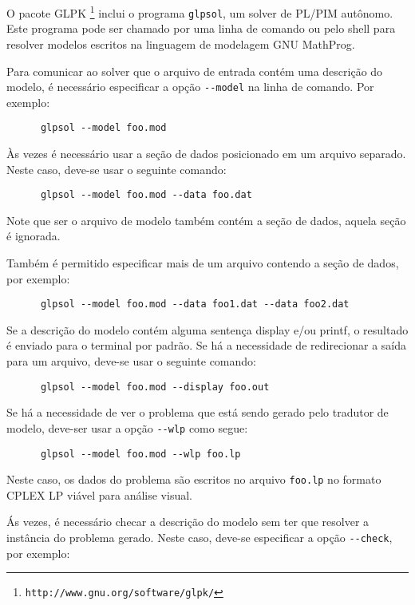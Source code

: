 \documentclass[11pt, brazil]{report}
\begin{document}
O pacote GLPK \footnote{{\tt http://www.gnu.org/software/glpk/}}
inclui o programa {\tt glpsol}, um solver de PL/PIM autônomo. Este
programa pode ser chamado por uma linha de comando ou pelo shell para
resolver modelos escritos na \linebreak linguagem de modelagem GNU MathProg.

Para comunicar ao solver que o arquivo de entrada contém uma descrição
do modelo, é necessário especificar a opção \verb|--model| na linha de
comando. Por exemplo:

\begin{verbatim}
      glpsol --model foo.mod
\end{verbatim}

Às vezes é necessário usar a seção de dados posicionado em um arquivo
separado. Neste caso, deve-se usar o seguinte comando:

\begin{verbatim}
      glpsol --model foo.mod --data foo.dat
\end{verbatim}

\noindent Note que ser o arquivo de modelo também contém a seção de dados,
aquela seção é ignorada.

Também é permitido especificar mais de um arquivo contendo a seção de dados,
por exemplo:

\begin{verbatim}
      glpsol --model foo.mod --data foo1.dat --data foo2.dat
\end{verbatim}

Se a descrição do modelo contém alguma sentença display e/ou printf,
o resultado é enviado para o terminal por padrão. Se há a necessidade
de redirecionar a saída para um arquivo, deve-se usar o seguinte comando:

\begin{verbatim}
      glpsol --model foo.mod --display foo.out
\end{verbatim}

Se há a necessidade de ver o problema que está sendo gerado pelo tradutor
de modelo, deve-ser usar a opção \verb|--wlp| como segue:

\begin{verbatim}
      glpsol --model foo.mod --wlp foo.lp
\end{verbatim}

\noindent Neste caso, os dados do problema são escritos no arquivo
\verb|foo.lp| no formato CPLEX LP viável para análise visual.

Ás vezes, é necessário checar a descrição do modelo sem ter que resolver
a instância do problema gerado. Neste caso, deve-se especificar a opção
\verb|--check|, por exemplo:
\end{document}
